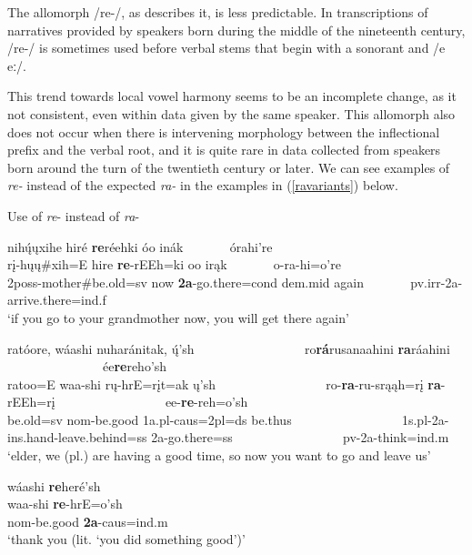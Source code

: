 \label{allomorphRE}

The allomorph /re-/, as \citet[5]{kennard1936} describes it, is less predictable. In transcriptions of narratives provided by speakers born during the middle of the nineteenth century, /re-/ is sometimes used before verbal stems that begin with a sonorant and /e eː/. 

This trend towards local vowel harmony seems to be an incomplete change, as it not consistent, even within data given by the same speaker. This allomorph also does not occur when there is intervening morphology between the inflectional prefix and the verbal root, and it is quite rare in data collected from speakers born around the turn of the twentieth century or later. We can see examples of \textit{re-} instead of the expected \textit{ra-} in the examples in (\ref{ravariants}) below.

\begin{exe}
\item\label{ravariants} Use of \textit{re}- instead of \textit{ra}-
	
	\begin{xlist}
	
	\item \glll nihų́ųxihe hiré \textbf{re}réehki óo inák ~ ~ ~ ~ órahi're\\
	rį-hųų\#xih=E hire \textbf{re}-rEEh=ki oo irąk ~ ~ ~ ~ o-ra-hi=o're\\
	2poss-\textnormal{mother}\#\textnormal{be.old}=sv \textnormal{now} \textbf{2a}-\textnormal{go.there}=cond dem.mid \textnormal{again} ~ ~ ~ ~ pv.irr-2a-\textnormal{arrive.there}=ind.f\\
	\glt `if you go to your grandmother now, you will get there again' \citep[102]{hollow1973a}
	
	\item \glll ratóore, wáashi nuharánitak, ų́'sh ~ ~ ~ ~ ~ ~ ~ ~ ~ ~ ro\textbf{rá}rusanaahini \textbf{ra}ráahini ~ ~ ~ ~ ~ ~ ~ ~ ~ ~ ée\textbf{re}reho'sh\\
	ratoo=E waa-shi rų-hrE=rįt=ak ų'sh ~ ~ ~ ~ ~ ~ ~ ~ ~ ~ ro-\textbf{ra}-ru-srąąh=rį \textbf{ra}-rEEh=rį ~ ~ ~ ~ ~ ~ ~ ~ ~ ~ ee-\textbf{re}-reh=o'sh\\
	\textnormal{be.old}=sv nom-\textnormal{be.good} 1a.pl-caus=2pl=ds \textnormal{be.thus} ~ ~ ~ ~ ~ ~ ~ ~ ~ ~ 1s.pl-2a-ins.hand-\textnormal{leave.behind}=ss 2a-\textnormal{go.there}=ss ~ ~ ~ ~ ~ ~ ~ ~ ~ ~ pv-2a-\textnormal{think}=ind.m\\
	\glt 	`elder, we (pl.) are having a good time, so now you want to go and leave us' \citep[31]{hollow1973a}
	
	\item \glll wáashi \textbf{re}heré'sh\\
	waa-shi \textbf{re}-hrE=o'sh\\
	nom-\textnormal{be.good} \textbf{2a}-caus=ind.m\\
	\glt `thank you (lit. `you did something good')' \citep[35]{hollow1973a}
	
	\end{xlist}
	
\end{exe}

